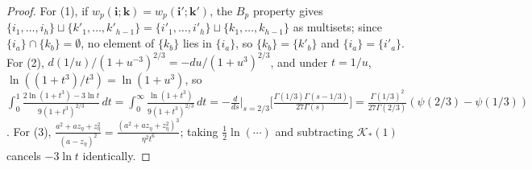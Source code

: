 \documentclass[11pt,a4paper]{article}
\theoremstyle{remark}
\begin{document}
\begin{proof}
For (1), if $w_p(\mathbf{i}; \mathbf{k}) = w_p(\mathbf{i}'; \mathbf{k}')$, the $B_p$ property gives $\{i_1, \dots, i_h\} \sqcup \{k'_1, \dots, k'_{h-1}\} = \{i'_1, \dots, i'_h\} \sqcup \{k_1, \dots, k_{h-1}\}$ as multisets; since $\{i_a\} \cap \{k_b\} = \emptyset$, no element of $\{k_b\}$ lies in $\{i_a\}$, so $\{k_b\} = \{k'_b\}$ and $\{i_a\} = \{i'_a\}$. For (2), $d(1/u)/(1+u^{-3})^{2/3} = -du/(1+u^3)^{2/3}$, and under $t = 1/u$, $\ln((1+t^3)/t^3) = \ln(1+u^3)$, so $\int_0^1 \frac{2\ln(1+t^3)-3\ln t}{9(1+t^3)^{2/3}}\,dt = \int_0^\infty \frac{\ln(1+t^3)}{9(1+t^3)^{2/3}}\,dt = -\frac{d}{ds}\big|_{s=2/3}\bigl[\frac{\Gamma(1/3)\Gamma(s-1/3)}{27\Gamma(s)}\bigr] = \frac{\Gamma(1/3)^2}{27\Gamma(2/3)}(\psi(2/3)-\psi(1/3))$. For (3), $\frac{a^2 + a z_\eta + z_\eta^2}{(a - z_\eta)^2} = \frac{(a^2 + a z_\eta + z_\eta^2)^3}{\eta^2 t^6}$; taking $\frac{1}{2}\ln(\cdots)$ and subtracting $\mathcal{K}_*(1)$ cancels $-3\ln t$ identically.
\end{proof}
\end{document}
